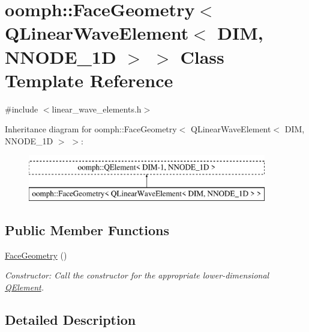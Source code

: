 \hypertarget{classoomph_1_1FaceGeometry_3_01QLinearWaveElement_3_01DIM_00_01NNODE__1D_01_4_01_4}{}\section{oomph\+:\+:Face\+Geometry$<$ Q\+Linear\+Wave\+Element$<$ D\+IM, N\+N\+O\+D\+E\+\_\+1D $>$ $>$ Class Template Reference}
\label{classoomph_1_1FaceGeometry_3_01QLinearWaveElement_3_01DIM_00_01NNODE__1D_01_4_01_4}


{\ttfamily \#include $<$linear\+\_\+wave\+\_\+elements.\+h$>$}

Inheritance diagram for oomph\+:\+:Face\+Geometry$<$ Q\+Linear\+Wave\+Element$<$ D\+IM, N\+N\+O\+D\+E\+\_\+1D $>$ $>$\+:\begin{figure}[H]
\begin{center}
\leavevmode
\includegraphics[height=2.000000cm]{classoomph_1_1FaceGeometry_3_01QLinearWaveElement_3_01DIM_00_01NNODE__1D_01_4_01_4}
\end{center}
\end{figure}
\subsection*{Public Member Functions}
\begin{DoxyCompactItemize}
\item 
\hyperlink{classoomph_1_1FaceGeometry_3_01QLinearWaveElement_3_01DIM_00_01NNODE__1D_01_4_01_4_ae598de898fd7867e0456ca763cdfecd1}{Face\+Geometry} ()
\begin{DoxyCompactList}\small\item\em Constructor\+: Call the constructor for the appropriate lower-\/dimensional \hyperlink{classoomph_1_1QElement}{Q\+Element}. \end{DoxyCompactList}\end{DoxyCompactItemize}


\subsection{Detailed Description}
